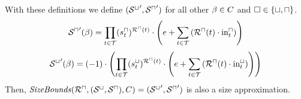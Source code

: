 \begin{theorem}
  With these definitions we define $({\mathcal{S}^\sqcup}', {\mathcal{S}^\sqcap}')$ for all other $\beta \in C$ and $\square \in \lbrace \sqcup, \sqcap \rbrace$.
  \[ {\mathcal{S}^\sqcap}'(\beta) =
  \prod_{t \in \mathcal{T}} (s^\sqcap_t)^{{\mathcal{R}^\sqcap}(t)} \cdot \left( e + 
  \sum_{t \in \mathcal{T}} \left( {\mathcal{R}^\sqcap}(t) \cdot \text{in}^\sqcap_t \right) \right)
  \]
  \[ {\mathcal{S}^\sqcup}'(\beta) = (-1) \cdot \left(
  \prod_{t \in \mathcal{T}} (s^\sqcup_t)^{{\mathcal{R}^\sqcap}(t)} \cdot \left( e + 
  \sum_{t \in \mathcal{T}} \left( {\mathcal{R}^\sqcap}(t) \cdot \text{in}^\sqcup_t \right) \right)
  \right)
  \]
  Then, $\mathit{SizeBounds}({\mathcal{R}^\sqcap}, {({\mathcal{S}^\sqcup}, {\mathcal{S}^\sqcap})}, C) = ({\mathcal{S}^\sqcup}', {\mathcal{S}^\sqcap}')$ is also a size approximation. 
\end{theorem}
